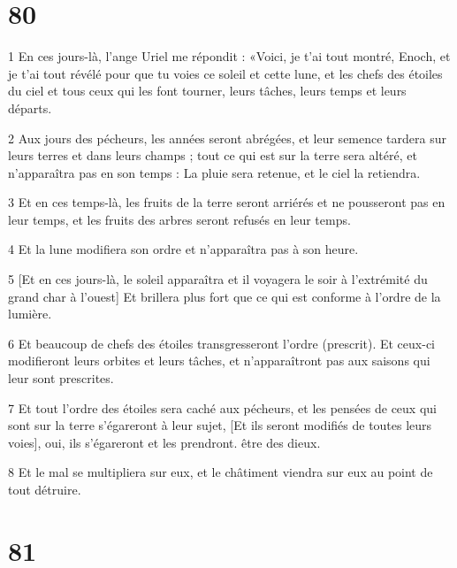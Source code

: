 \chapter{80}

\par 1 En ces jours-là, l'ange Uriel me répondit : «Voici, je t'ai tout montré, Enoch, et je t'ai tout révélé pour que tu voies ce soleil et cette lune, et les chefs des étoiles du ciel et tous ceux qui les font tourner, leurs tâches, leurs temps et leurs départs.
\par 2 Aux jours des pécheurs, les années seront abrégées, et leur semence tardera sur leurs terres et dans leurs champs ; tout ce qui est sur la terre sera altéré, et n'apparaîtra pas en son temps : La pluie sera retenue, et le ciel la retiendra.
\par 3 Et en ces temps-là, les fruits de la terre seront arriérés et ne pousseront pas en leur temps, et les fruits des arbres seront refusés en leur temps.
\par 4 Et la lune modifiera son ordre et n'apparaîtra pas à son heure.
\par 5 [Et en ces jours-là, le soleil apparaîtra et il voyagera le soir à l'extrémité du grand char à l'ouest] Et brillera plus fort que ce qui est conforme à l'ordre de la lumière.
\par 6 Et beaucoup de chefs des étoiles transgresseront l'ordre (prescrit). Et ceux-ci modifieront leurs orbites et leurs tâches, et n'apparaîtront pas aux saisons qui leur sont prescrites.
\par 7 Et tout l'ordre des étoiles sera caché aux pécheurs, et les pensées de ceux qui sont sur la terre s'égareront à leur sujet, [Et ils seront modifiés de toutes leurs voies], oui, ils s'égareront et les prendront. être des dieux.
\par 8 Et le mal se multipliera sur eux, et le châtiment viendra sur eux au point de tout détruire.

\chapter{81}

